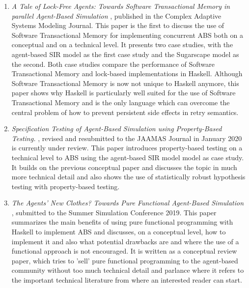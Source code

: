 \begin{enumerate}
	\item \textit{A Tale of Lock-Free Agents: Towards Software Transactional Memory in parallel Agent-Based Simulation} \cite{thaler_tale_2018}, published in the Complex Adaptive Systems Modeling Journal. This paper is the first to discuss the use of Software Transactional Memory for implementing concurrent ABS both on a conceptual and on a technical level. It presents two case studies, with the agent-based SIR model as the first case study and the Sugarscape model as the second. Both case studies compare the performance of Software Transactional Memory and lock-based implementations in Haskell. Although Software Transactional Memory is now not unique to Haskell anymore, this paper shows why Haskell is particularly well suited for the use of Software Transactional Memory and is the only language which can overcome the central problem of how to prevent persistent side effects in retry semantics.

	\item \textit{Specification Testing of Agent-Based Simulation using Property-Based Testing.} \cite{thaler_specification_2019}, revised and resubmitted to the JAAMAS Journal in January 2020 is currently under review.
This paper introduces property-based testing on a technical level to ABS using the agent-based SIR model model as case study. It builds on the previous conceptual paper and discusses the topic in much more technical detail and also shows the use of statistically robust hypothesis testing with property-based testing.
	
	\item \textit{The Agents' New Clothes? Towards Pure Functional Agent-Based Simulation} \cite{thaler_agents_2019}, submitted to the Summer Simulation Conference 2019. This paper summarizes the main benefits of using pure functional programming with Haskell to implement ABS and discusses, on a conceptual level, how to implement it and also what potential drawbacks are and where the use of a functional approach is not encouraged. It is written as a conceptual review paper, which tries to 'sell' pure functional programming to the agent-based community without too much technical detail and parlance where it refers to the important technical literature from where an interested reader can start.
\end{enumerate}